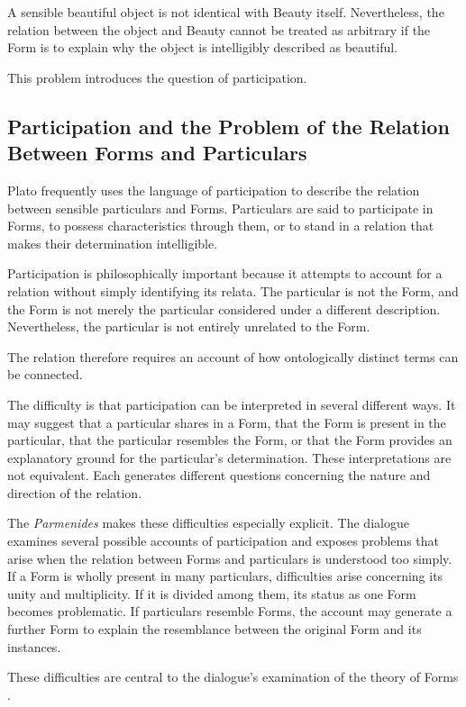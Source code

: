 A sensible beautiful object is not identical with Beauty itself.
Nevertheless, the relation between the object and Beauty cannot be
treated as arbitrary if the Form is to explain why the object is
intelligibly described as beautiful.

This problem introduces the question of participation.

\subsection{Participation and the Problem of the Relation Between Forms and Particulars}

Plato frequently uses the language of participation to describe the
relation between sensible particulars and Forms. Particulars are said
to participate in Forms, to possess characteristics through them, or
to stand in a relation that makes their determination intelligible.

Participation is philosophically important because it attempts to
account for a relation without simply identifying its relata. The
particular is not the Form, and the Form is not merely the particular
considered under a different description. Nevertheless, the particular
is not entirely unrelated to the Form.

The relation therefore requires an account of how ontologically
distinct terms can be connected.

The difficulty is that participation can be interpreted in several
different ways. It may suggest that a particular shares in a Form, that
the Form is present in the particular, that the particular resembles
the Form, or that the Form provides an explanatory ground for the
particular's determination. These interpretations are not equivalent.
Each generates different questions concerning the nature and direction
of the relation.

The \textit{Parmenides} makes these difficulties especially explicit.
The dialogue examines several possible accounts of participation and
exposes problems that arise when the relation between Forms and
particulars is understood too simply. If a Form is wholly present in
many particulars, difficulties arise concerning its unity and
multiplicity. If it is divided among them, its status as one Form
becomes problematic. If particulars resemble Forms, the account may
generate a further Form to explain the resemblance between the
original Form and its instances.

These difficulties are central to the dialogue's examination of the
theory of Forms \citep{PlatoParmenides}.

